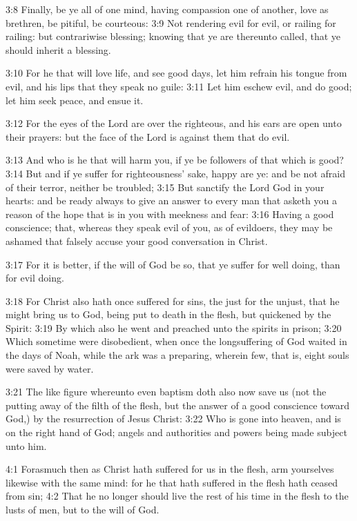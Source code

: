 3:8 Finally, be ye all of one mind, having compassion one of another, love as brethren, be pitiful, be courteous: 3:9 Not rendering evil for evil, or railing for railing: but contrariwise blessing; knowing that ye are thereunto called, that ye should inherit a blessing.

3:10 For he that will love life, and see good days, let him refrain his tongue from evil, and his lips that they speak no guile: 3:11 Let him eschew evil, and do good; let him seek peace, and ensue it.

3:12 For the eyes of the Lord are over the righteous, and his ears are open unto their prayers: but the face of the Lord is against them that do evil.

3:13 And who is he that will harm you, if ye be followers of that which is good?  3:14 But and if ye suffer for righteousness' sake, happy are ye: and be not afraid of their terror, neither be troubled; 3:15 But sanctify the Lord God in your hearts: and be ready always to give an answer to every man that asketh you a reason of the hope that is in you with meekness and fear: 3:16 Having a good conscience; that, whereas they speak evil of you, as of evildoers, they may be ashamed that falsely accuse your good conversation in Christ.

3:17 For it is better, if the will of God be so, that ye suffer for well doing, than for evil doing.

3:18 For Christ also hath once suffered for sins, the just for the unjust, that he might bring us to God, being put to death in the flesh, but quickened by the Spirit: 3:19 By which also he went and preached unto the spirits in prison; 3:20 Which sometime were disobedient, when once the longsuffering of God waited in the days of Noah, while the ark was a preparing, wherein few, that is, eight souls were saved by water.

3:21 The like figure whereunto even baptism doth also now save us (not the putting away of the filth of the flesh, but the answer of a good conscience toward God,) by the resurrection of Jesus Christ: 3:22 Who is gone into heaven, and is on the right hand of God; angels and authorities and powers being made subject unto him.

4:1 Forasmuch then as Christ hath suffered for us in the flesh, arm yourselves likewise with the same mind: for he that hath suffered in the flesh hath ceased from sin; 4:2 That he no longer should live the rest of his time in the flesh to the lusts of men, but to the will of God.

